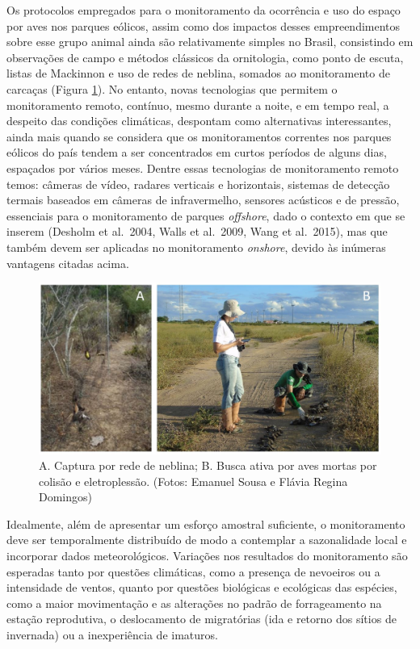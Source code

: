 \documentclass[
  oneside]{scrbook}
\begin{document}
Os protocolos empregados para o monitoramento da ocorrência e uso do espaço por aves nos parques eólicos, assim como dos impactos desses empreendimentos sobre esse grupo animal ainda são relativamente simples no Brasil, consistindo em observações de campo e métodos clássicos da ornitologia, como ponto de escuta, listas de Mackinnon e uso de redes de neblina, somados ao monitoramento de carcaças (Figura \ref{fig:20}). No entanto, novas tecnologias que permitem o monitoramento remoto, contínuo, mesmo durante a noite, e em tempo real, a despeito das condições climáticas, despontam como alternativas interessantes, ainda mais quando se considera que os monitoramentos correntes nos parques eólicos do país tendem a ser concentrados em curtos períodos de alguns dias, espaçados por vários meses. Dentre essas tecnologias de monitoramento remoto temos: câmeras de vídeo, radares verticais e horizontais, sistemas de detecção termais baseados em câmeras de infravermelho, sensores acústicos e de pressão, essenciais para o monitoramento de parques \emph{offshore}, dado o contexto em que se inserem (Desholm et al.~2004, Walls et al.~2009, Wang et al.~2015), mas que também devem ser aplicadas no monitoramento \emph{onshore}, devido às inúmeras vantagens citadas acima.

\begin{figure}[H]

{\centering \includegraphics[width=0.75\linewidth]{imagens/cap06/Figura_6.3ab} 

}

\caption{A. Captura por rede de neblina; B. Busca ativa por aves mortas por colisão e eletroplessão. (Fotos: Emanuel Sousa e Flávia Regina Domingos)}\label{fig:20}
\end{figure}

Idealmente, além de apresentar um esforço amostral suficiente, o monitoramento deve ser temporalmente distribuído de modo a contemplar a sazonalidade local e incorporar dados meteorológicos. Variações nos resultados do monitoramento são esperadas tanto por questões climáticas, como a presença de nevoeiros ou a intensidade de ventos, quanto por questões biológicas e ecológicas das espécies, como a maior movimentação e as alterações no padrão de forrageamento na estação reprodutiva, o deslocamento de migratórias (ida e retorno dos sítios de invernada) ou a inexperiência de imaturos.
\end{document}
